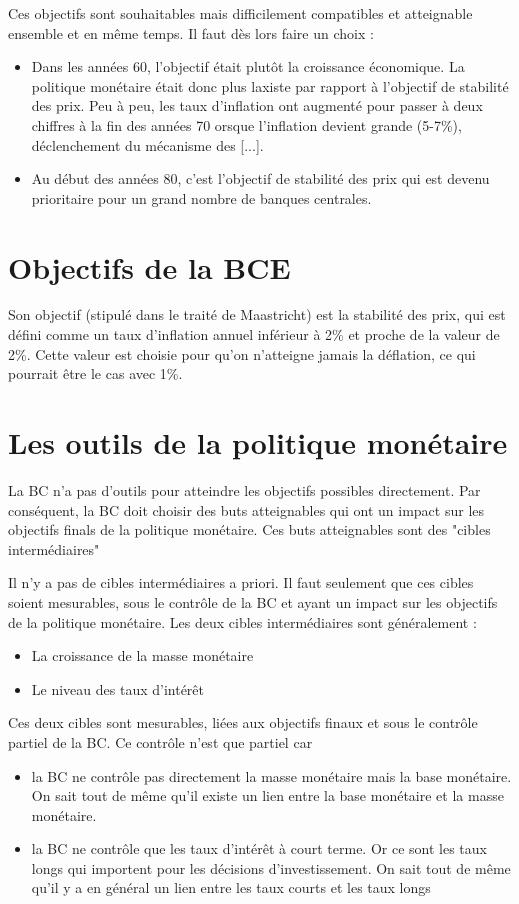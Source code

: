 Ces objectifs sont souhaitables mais difficilement compatibles et atteignable ensemble et en même temps. Il faut dès lors faire un choix :

\begin{itemize}
	\item Dans les années 60, l'objectif était plutôt la croissance économique. La politique monétaire était donc plus laxiste par rapport à l'objectif de stabilité des prix. Peu à peu, les taux d'inflation ont augmenté pour passer à deux chiffres à la fin des années 70 orsque l'inflation devient grande (5-7\%), déclenchement du mécanisme des [...].
	\item Au début des années 80, c'est l'objectif de stabilité des prix qui est devenu prioritaire pour un grand nombre de banques centrales.
\end{itemize}

\section{Objectifs de la BCE}

Son objectif (stipulé dans le traité de Maastricht) est la stabilité des prix, qui est défini comme un taux d'inflation annuel inférieur à 2\% et proche de la valeur de 2\%. Cette valeur est choisie pour qu'on n'atteigne jamais la déflation, ce qui pourrait être le cas avec 1\%.

\section{Les outils de la politique monétaire}

La BC n'a pas d'outils pour atteindre les objectifs possibles directement. Par conséquent, la BC doit choisir des buts atteignables qui ont un impact sur les objectifs finals de la politique monétaire. 
Ces buts atteignables sont des "cibles intermédiaires"

Il n'y a pas de cibles intermédiaires a priori. Il faut seulement que ces cibles soient mesurables, sous le contrôle de la BC et ayant un impact sur les objectifs de la politique monétaire. Les deux cibles intermédiaires sont généralement :

\begin{itemize}
	\item La croissance de la masse monétaire
	\item Le niveau des taux d'intérêt
\end{itemize}

Ces deux cibles sont mesurables, liées aux objectifs finaux et sous le contrôle partiel de la BC. Ce contrôle n'est que partiel car
\begin{itemize}
	\item la BC ne contrôle pas directement la masse monétaire mais la base monétaire. On sait tout de même qu'il existe un lien entre la base monétaire et la masse monétaire.
	\item la BC ne contrôle que les taux d'intérêt à court terme. Or ce sont les taux longs qui importent pour les décisions d'investissement. On sait tout de même qu'il y a en général un lien entre les taux courts et les taux longs
\end{itemize}

